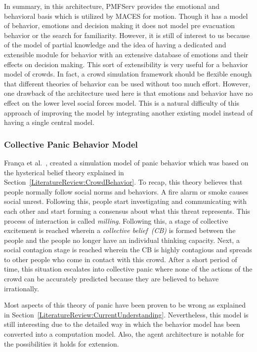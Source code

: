 In summary, in this architecture, PMFServ provides the emotional and behavioral basis which is utilized by MACES for motion. Though it has a model of behavior, emotions and decision making it does not model pre evacuation behavior or the search for familiarity. However, it is still of interest to us because of the model of partial knowledge and the idea of having a dedicated and extensible module for behavior with an extensive database of emotions and their effects on decision making. This sort of extensibility is very useful for a behavior model of crowds. In fact, a crowd simulation framework should be flexible enough that different theories of behavior can be used without too much effort. However, one drawback of the architecture used here is that emotions and behavior have no effect on the lower level social forces model. This is a natural difficulty of this approach of improving the model by integrating another existing model instead of having a single central model.

\subsubsection{Collective Panic Behavior Model}

Fran{\c c}a et al.~\cite{Franca:2009wq}, created a simulation model of panic behavior which was based on the hysterical belief theory explained in Section~\ref{LiteratureReview:CrowdBehavior}. To recap, this theory believes that people normally follow social norms and behaviors. A fire alarm or smoke causes social unrest. Following this, people start investigating and communicating with each other and start forming a consensus about what this threat represents. This process of interaction is called \emph{milling}. Following this, a stage of collective excitement is reached wherein a \emph{collective belief~(CB)} is formed between the people and the people no longer have an individual thinking capacity. Next, a social contagion stage is reached wherein the CB is highly contagious and spreads to other people who come in contact with this crowd. After a short period of time, this situation escalates into collective panic where none of the actions of the crowd can be accurately predicted because they are believed to behave irrationally.

Most aspects of this theory of panic have been proven to be wrong as explained in Section~\ref{LiteratureReview:CurrentUnderstanding}. Nevertheless, this model is still interesting due to the detailed way in which the behavior model has been converted into a computation model. Also, the agent architecture is notable for the possibilities it holds for extension.

